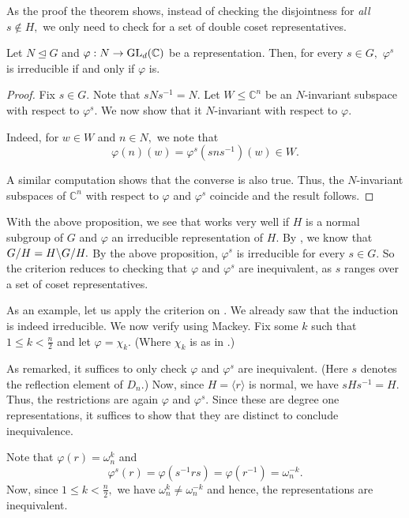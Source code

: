 \begin{rem}
	As the proof the theorem shows, instead of checking the disjointness for \emph{all} $s \notin H,$ we only need to check for a set of double coset representatives. 
\end{rem}

\begin{prop}
	Let $N \unlhd G$ and $\varphi : N \to \operatorname{GL}_d(\mathbb{C})$ be a representation. Then, for every $s \in G,$ $\varphi^s$ is irreducible if and only if $\varphi$ is.
\end{prop}
\begin{proof} 
	Fix $s \in G.$ Note that $sNs^{-1} = N.$ Let $W \le \mathbb{C}^n$ be an $N$-invariant subspace with respect to $\varphi^s.$ We now show that it $N$-invariant with respect to $\varphi.$

	Indeed, for $w \in W$ and $n \in N,$ we note that
	\begin{equation*} 
		\varphi(n)(w) = \varphi^s(sns^{-1})(w) \in W.
	\end{equation*}

	A similar computation shows that the converse is also true. Thus, the $N$-invariant subspaces of $\mathbb{C}^n$ with respect to $\varphi$ and $\varphi^s$ coincide and the result follows.
\end{proof}

\begin{rem}
	With the above proposition, we see that  works very well if $H$ is a normal subgroup of $G$ and $\varphi$ an irreducible representation of $H.$ By , we know that $G/H = \dcos{H}{G}{H}.$ By the above proposition, $\varphi^s$ is irreducible for every $s \in G.$ So the criterion reduces to checking that $\varphi$ and $\varphi^s$ are inequivalent, as $s$ ranges over a set of coset representatives.
\end{rem}

\begin{ex}
	As an example, let us apply the criterion on . We already saw that the induction is indeed irreducible. We now verify using Mackey. Fix some $k$ such that $1 \le k < \frac{n}{2}$ and let $\varphi = \chi_k.$ (Where $\chi_k$ is as in .)

	As remarked, it suffices to only check $\varphi$ and $\varphi^s$ are inequivalent. (Here $s$ denotes the reflection element of $D_n.$) Now, since $H = \langle r\rangle$ is normal, we have $sHs^{-1} = H.$ Thus, the restrictions are again $\varphi$ and $\varphi^s.$ Since these are degree one representations, it suffices to show that they are distinct to conclude inequivalence.

	Note that $\varphi(r) = \omega_n^k$ and
	\begin{equation*} 
		\varphi^s(r) = \varphi(s^{-1}rs) = \varphi(r^{-1}) = \omega_n^{-k}.
	\end{equation*}
	Now, since $1 \le k < \frac{n}{2},$ we have $\omega_n^k \neq \omega_n^{-k}$ and hence, the representations are inequivalent.
\end{ex}

